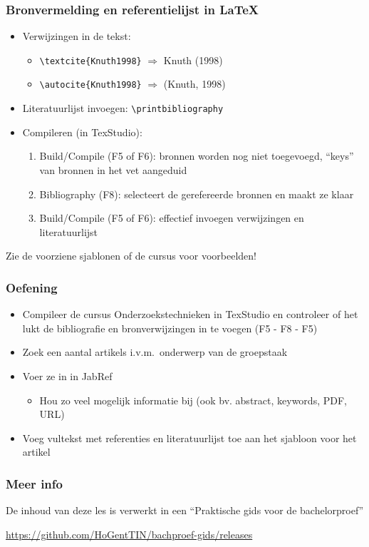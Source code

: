 \documentclass[aspectratio=169]{beamer}
\begin{document}
\begin{frame}[fragile]
  \frametitle{Bronvermelding en referentielijst in {\LaTeX}}
  
  \begin{itemize}
    \item Verwijzingen in de tekst:
    
    \begin{itemize}
      \item \verb|\textcite{Knuth1998}| $\Rightarrow$ Knuth (1998)
      \item \verb|\autocite{Knuth1998}| $\Rightarrow$ (Knuth, 1998)
    \end{itemize}
    
    \item Literatuurlijst invoegen: \verb|\printbibliography|
    
    \item Compileren (in TexStudio):
    
    \begin{enumerate}
      \item Build/Compile (F5 of F6): bronnen worden nog niet toegevoegd, ``keys'' van bronnen in het vet aangeduid
      \item Bibliography (F8): selecteert de gerefereerde bronnen en maakt ze klaar
      \item Build/Compile (F5 of F6): effectief invoegen verwijzingen en literatuurlijst
    \end{enumerate}
  \end{itemize}
  
  Zie de voorziene sjablonen of de cursus voor voorbeelden!
\end{frame}

\begin{frame}
  \frametitle{Oefening}
  
  \begin{itemize}
    \item Compileer de cursus Onderzoekstechnieken in TexStudio en controleer of het lukt de bibliografie en bronverwijzingen in te voegen (F5 - F8 - F5)
    \item Zoek een aantal artikels i.v.m.~onderwerp van de groepstaak
    \item Voer ze in in JabRef
    \begin{itemize}
      \item Hou zo veel mogelijk informatie bij (ook bv. abstract, keywords, PDF, URL)
    \end{itemize}
    \item Voeg vultekst met referenties en literatuurlijst toe aan het sjabloon voor het artikel
  \end{itemize}
\end{frame}

\begin{frame}
  \frametitle{Meer info}
  
  De inhoud van deze les is verwerkt in een ``Praktische gids voor de bachelorproef''
  
  \vspace{12pt}
  
  \url{https://github.com/HoGentTIN/bachproef-gids/releases}
  
\end{frame}
\end{document}
